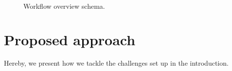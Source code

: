 \begin{figure}
	\begin{center}
		\caption{Workflow overview schema.}
		\label{fig:1}
	\end{center}
	\vspace{-20pt}
\end{figure}
\section{Proposed approach}
Hereby, we present how we tackle the challenges set up in the introduction.
